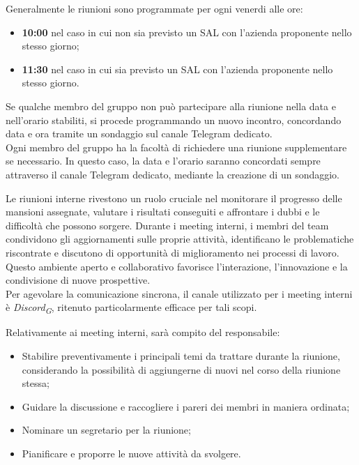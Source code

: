 Generalmente le riunioni sono programmate per ogni venerdi alle ore:
\begin{itemize}
    \item \textbf{10:00} nel caso in cui non sia previsto un SAL con l'azienda proponente nello stesso giorno;
    \item \textbf{11:30} nel caso in cui sia previsto un SAL con l'azienda proponente nello stesso giorno.
\end{itemize}
Se qualche membro del gruppo non può partecipare alla riunione nella data e nell'orario stabiliti, si procede programmando un nuovo incontro, concordando data e ora tramite un sondaggio sul canale Telegram dedicato. \\
Ogni membro del gruppo ha la facoltà di richiedere una riunione supplementare se necessario. In questo caso, la data e l'orario saranno concordati sempre attraverso il canale Telegram dedicato, mediante la creazione di un sondaggio.

Le riunioni interne rivestono un ruolo cruciale nel monitorare il progresso delle mansioni assegnate, valutare i risultati conseguiti e affrontare i dubbi e le difficoltà che possono sorgere. Durante i meeting interni, i membri del team condividono gli aggiornamenti sulle proprie attività, identificano le problematiche riscontrate e discutono di opportunità di miglioramento nei processi di lavoro. Questo ambiente aperto e collaborativo favorisce l'interazione, l'innovazione e la condivisione di nuove prospettive.\\

Per agevolare la comunicazione sincrona, il canale utilizzato per i meeting interni è \textit{Discord}\textsubscript{\textit{G}}, ritenuto particolarmente efficace per tali scopi.

\vspace{0,1cm}

Relativamente ai meeting interni, sarà compito del responsabile:
\begin{itemize}
    \item Stabilire preventivamente i principali temi da trattare durante la riunione, considerando la possibilità di aggiungerne di nuovi nel corso della riunione stessa;
    \item Guidare la discussione e raccogliere i pareri dei membri in maniera ordinata;
    \item Nominare un segretario per la riunione;
    \item Pianificare e proporre le nuove attività da svolgere.
\end{itemize}

